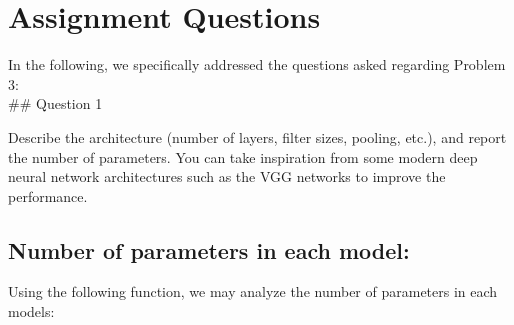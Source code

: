 \documentclass[11pt]{article}
\begin{document}
    \section{Assignment Questions}\label{assignment-questions}

In the following, we specifically addressed the questions asked
regarding Problem 3:\\
\#\# Question 1

Describe the architecture (number of layers, filter sizes, pooling,
etc.), and report the number of parameters. You can take inspiration
from some modern deep neural network architectures such as the VGG
networks to improve the performance.

    \subsection{Number of parameters in each
model:}\label{number-of-parameters-in-each-model}

Using the following function, we may analyze the number of parameters in
each models:
\end{document}
